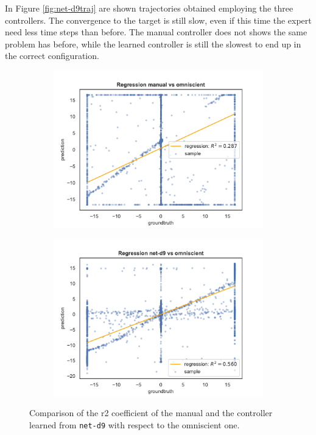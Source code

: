 In Figure \ref{fig:net-d9traj} are shown trajectories obtained employing the three 
controllers. The convergence to the target is still slow, even if this time the expert 
need less time steps than before. 
The manual controller does not shows the same problem has before, while the 
learned controller is still the slowest to end up in the correct configuration.
\begin{figure}[!htb]
	\centering
	\begin{subfigure}[h]{0.49\textwidth}
		\centering
		\includegraphics[width=\textwidth]{contents/images/net-d9/regression-manualvsomniscient}%
	\end{subfigure}
	\hfill
	\begin{subfigure}[h]{0.49\textwidth}
		\centering
		\includegraphics[width=\textwidth]{contents/images/net-d9/regression-net-d9-vs-omniscient}
	\end{subfigure}
	\caption[Evaluation of the \gls{r2} coefficients of \texttt{net-d9}.]{Comparison 
	of the \gls{r2} coefficient of the manual and the controller learned from 
	\texttt{net-d9} with respect to the omniscient one.}
	\label{fig:net-d9r2}
\end{figure}
